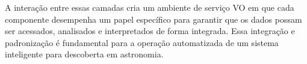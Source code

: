 A interação entre essas camadas cria um ambiente de serviço VO em que cada componente desempenha um papel específico para garantir que os dados possam ser acessados, analisados e interpretados de forma integrada. Essa integração e padronização é fundamental para a operação automatizada de um sistema inteligente para descoberta em astronomia. %













\chaptersep
